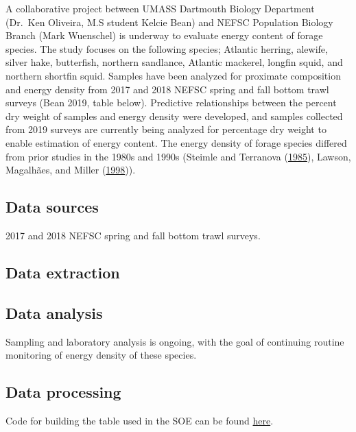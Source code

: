 \documentclass[
]{book}
\begin{document}
A collaborative project between UMASS Dartmouth Biology Department (Dr.~Ken Oliveira, M.S student Kelcie Bean) and NEFSC Population Biology Branch (Mark Wuenschel) is underway to evaluate energy content of forage species. The study focuses on the following species; Atlantic herring, alewife, silver hake, butterfish, northern sandlance, Atlantic mackerel, longfin squid, and northern shortfin squid. Samples have been analyzed for proximate composition and energy density from 2017 and 2018 NEFSC spring and fall bottom trawl surveys (Bean 2019, table below). Predictive relationships between the percent dry weight of samples and energy density were developed, and samples collected from 2019 surveys are currently being analyzed for percentage dry weight to enable estimation of energy content. The energy density of forage species differed from prior studies in the 1980s and 1990s (Steimle and Terranova (\protect\hyperlink{ref-steimle1985}{1985}), Lawson, Magalhães, and Miller (\protect\hyperlink{ref-lawson1998}{1998})).

\hypertarget{data-sources-14}{%
\subsection{Data sources}\label{data-sources-14}}

2017 and 2018 NEFSC spring and fall bottom trawl surveys.

\hypertarget{data-extraction-13}{%
\subsection{Data extraction}\label{data-extraction-13}}

\hypertarget{data-analysis-13}{%
\subsection{Data analysis}\label{data-analysis-13}}

Sampling and laboratory analysis is ongoing, with the goal of continuing routine monitoring of energy density of these species.

\hypertarget{data-processing-10}{%
\subsection{Data processing}\label{data-processing-10}}

Code for building the table used in the SOE can be found
\href{https://github.com/NOAA-EDAB/ecodata/blob/master/chunk-scripts/macrofauna.Rmd-forage.R}{here}.
\end{document}
